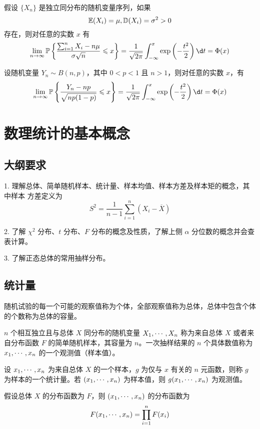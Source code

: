 \begin{theorem}[列维 - 林德伯格定理]
	假设 $\{X_n\}$ 是独立同分布的随机变量序列，如果
	\[ \mathbb{E}(X_i) = \mu, \mathbb{D}(X_i) = \sigma^2 > 0 \]
	存在，则对任意的实数 $x$ 有
	\[ \lim_{n \to \infty} \bbP\left\{ \frac{\sum_{i=1}^n X_i - n \mu}{\sigma \sqrt{n}} \leqslant x \right\} = \frac{1}{\sqrt{2 \pi}} \int_{-\infty}^x \exp\left(-\frac{t^2}{2}\right) \d t = \Phi(x)  \]
\end{theorem}

\begin{theorem}
	设随机变量 $Y_n \sim B(n, p)$，其中 $0 < p < 1$ 且 $n > 1$，则对任意的实数 $x$，有
	\[ \lim_{n \to \infty} \bbP\left\{ \frac{Y_n - np}{\sqrt{np(1 - p)}} \leqslant x \right\} = \frac{1}{\sqrt{2 \pi}} \int_{-\infty}^x \exp\left(-\frac{t^2}{2}\right) \d t = \Phi(x)  \]
\end{theorem}


\section{数理统计的基本概念}

\subsection{大纲要求}

1. 理解总体、简单随机样本、统计量、样本均值、样本方差及样本矩的概念，其中样本
方差定义为
\[ S^2 = \frac{1}{n-1} \sum_{i=1}^n (X_i - \overline{X}) \]

2. 了解 $\chi^2$ 分布、$t$ 分布、$F$ 分布的概念及性质，了解上侧 $\alpha$ 分位数的概念并会查表计算。

3. 了解正态总体的常用抽样分布。

\subsection{统计量}

随机试验的每一个可能的观察值称为个体，全部观察值称为总体，总体中包含个体的个数称为总体的容量。

$n$ 个相互独立且与总体 $X$ 同分布的随机变量 $X_1,\cdots,X_n$ 称为来自总体 $X$ 或者来自分布函数 $F$ 的简单随机样本，其容量为 $n$。一次抽样结果的 $n$ 个具体数值称为 $x_1,\cdots,x_n$ 的一个观测值（样本值）。

设 $x_1,\cdots,x_n$ 为来自总体 $X$ 的一个样本，$g$ 为仅与 $x$ 有关的 $n$ 元函数，则称 $g$ 为样本的一个统计量。若 $(x_1,\cdots,x_n)$ 为样本值，则 $g(x_1,\cdots,x_n)$ 为观测值。

假设总体 $X$ 的分布函数为 $F$，则 $(x_1,\cdots,x_n)$ 的分布函数为
\[ F(x_1,\cdots,x_n) = \prod_{i=1}^n F(x_i) \]

